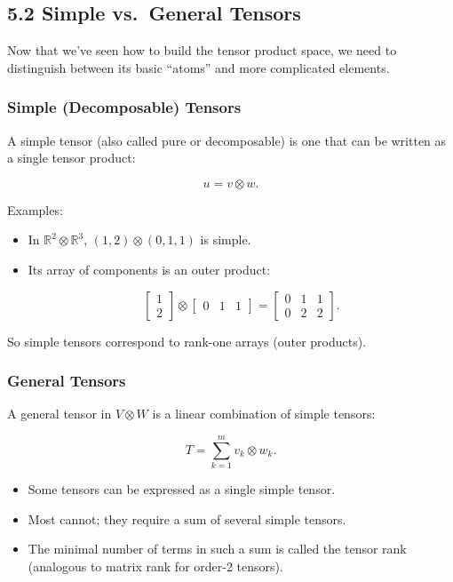 \documentclass[
  letterpaper,
  DIV=11,
  numbers=noendperiod]{scrreprt}
\providecommand{\tightlist}{%
  \setlength{\itemsep}{0pt}\setlength{\parskip}{0pt}}
\begin{document}
\subsection{5.2 Simple vs.~General
Tensors}\label{simple-vs.-general-tensors}

Now that we've seen how to build the tensor product space, we need to
distinguish between its basic ``atoms'' and more complicated elements.

\subsubsection{Simple (Decomposable)
Tensors}\label{simple-decomposable-tensors}

A simple tensor (also called pure or decomposable) is one that can be
written as a single tensor product:

\[
u = v \otimes w.
\]

Examples:

\begin{itemize}
\item
  In \(\mathbb{R}^2 \otimes \mathbb{R}^3\), \((1,2) \otimes (0,1,1)\) is
  simple.
\item
  Its array of components is an outer product:

  \[
  \begin{bmatrix}1 \\ 2\end{bmatrix}
  \otimes
  \begin{bmatrix}0 & 1 & 1\end{bmatrix}
  =
  \begin{bmatrix}0 & 1 & 1 \\ 0 & 2 & 2\end{bmatrix}.
  \]
\end{itemize}

So simple tensors correspond to rank-one arrays (outer products).

\subsubsection{General Tensors}\label{general-tensors}

A general tensor in \(V \otimes W\) is a linear combination of simple
tensors:

\[
T = \sum_{k=1}^m v_k \otimes w_k.
\]

\begin{itemize}
\tightlist
\item
  Some tensors can be expressed as a single simple tensor.
\item
  Most cannot; they require a sum of several simple tensors.
\item
  The minimal number of terms in such a sum is called the tensor rank
  (analogous to matrix rank for order-2 tensors).
\end{itemize}
\end{document}
